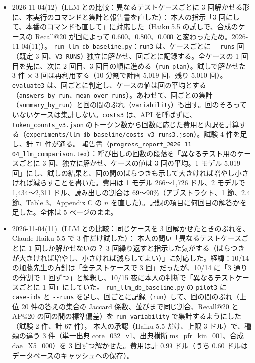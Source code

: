 \documentclass[11pt,a4paper]{jsarticle}
\begin{document}
\begin{itemize}[nosep]
  \item 2026-11-04(12)（LLM との比較：異なるテストケースごとに 3 回解かせる形に、本実行のコマンドと集計と報告書を直した）：
    本人の指示「3 回にして、本番のコマンドも直して」に対応した（Haiku 5.5 の試しで、合成のケースの Recall@20 が回によって 0.600、0.800、0.000 と変わったため。2026-11-04(11)）。
    \texttt{run\_llm\_db\_baseline.py}：\texttt{run3} は、ケースごとに \texttt{-{}-runs} 回（既定 3 回、\texttt{V3\_RUNS}）独立に解かせ、回ごとに記録する。全ケースの 1 回目を先に、次に 2 回目、3 回目の順に進める（\texttt{run\_plan}）。試しで解かせた 3 件 × 3 回は再利用する（10 分割で計画 5{,}019 回、残り 5{,}010 回）。\texttt{evaluate3} は、回ごとに判定し、ケースの値は回の平均とする（\texttt{answers\_by\_run}、\texttt{mean\_over\_runs}）。あわせて、回ごとの集計（\texttt{summary\_by\_run}）と回の間のぶれ（\texttt{variability}）も出す。回のそろっていないケースは集計しない。\texttt{costs3} は、API を呼ばずに、\texttt{token\_counts\_v3.json} のトークン数から回数に応じた費用と内訳を計算する（\texttt{experiments/llm\_db\_baseline/costs\_v3\_runs3.json}）。試験 4 件を足し、計 71 件が通る。
    報告書（\texttt{progress\_report\_2026-11-04\_llm\_comparison.tex}）：呼び出しの回数の段落を「異なるテスト用のケースごとに 3 回、独立に解かせ、ケースの値は 3 回の平均。1 モデル 5{,}019 回」にし、試しの結果と、回の間のばらつきも示して大きければ増やし小さければ減らすことを書いた。費用は 1 モデル 266〜1{,}726 ドル、2 モデルで 1{,}434〜2{,}311 ドル、読み出しの割合は 69〜90\%（アブストラクト、1 節、2.4 節、Table 3、Appendix C の $n$ を直した）。記録の項目に何回目の解答かを足した。全体は 5 ページのまま。
  \item 2026-11-04(11)（LLM との比較：同じケースを 3 回解かせたときのぶれを、Claude Haiku 5.5 で 3 件だけ試した）：
    本人の問い「異なるテストケースごとに 1 回しか解かせないの？ 3 回繰り返すと指示した気がする（ばらつきが大きければ増やし、小さければ減らしてよい）」に対応した。経緯：10/14 の加藤先生の方針は「全テストケースで 3 回」だったが、10/14 に「3 通りの分割で 1 回ずつ」と解釈し、10/15 夜に本人の判断で「異なるテストケースごとに 1 回」にしていた。
    \texttt{run\_llm\_db\_baseline.py} の \texttt{pilot3} に \texttt{-{}-case-ids} と \texttt{-{}-runs} を足し、回ごとに記録（\texttt{run}）して、回の間のぶれ（上位 20 件の答えの集合の Jaccard 係数、並びまで同じ割合、Recall@20 と AP@20 の回の間の標準偏差）を \texttt{run\_variability} で集計するようにした（試験 2 件、計 67 件）。
    本人の承認（Haiku 5.5 だけ、上限 3 ドル）で、種類の違う 3 件（単一出典 core\_032\_v1、出典横断 ms\_pfr\_kin\_001、合成 dae\_X5\_000）を 3 回ずつ解かせた。費用は計 0.99 ドル（うち 0.60 ドルはデータベースのキャッシュへの保存）。

\end{itemize}
\end{document}
